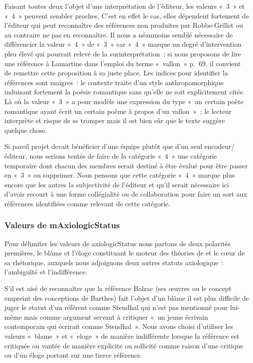 \documentclass[12pt, a4paper]{article}
\begin{document}
Faisant toutes deux l'objet d'une interprétation de l'éditeur, les valeurs «~3~» et «~4~» peuvent sembler proches. C'est en effet le cas, elles dépendent fortement de l'éditeur qui peut reconnaître des références non produites par Robbe-Grillet ou au contraire ne pas en reconnaître. Il nous a néanmoins semblé nécessaire de différencier la valeur «~4~» de «~3~» car «~4~» marque un degré d'intervention plsu élevé qui pourrait relevé de la surinterprétation~: si nous proposons de lire une référence à Lamartine dans l'emploi du terme «~vallon~» p.~69, il convient de remettre cette proposition à sa juste place. Les indices pour identifier la références sont maigres~: le contexte traite d'un style anthropomorphique induisant fortement la poésie romantique sans qu'elle ne soit explicitement citée. Là où la valeur «~3~» a pour modèle une expression du type «~un certain poète romantique ayant écrit un certain poème à propos d'un vallon~»~; le lecteur interprète et risque de se tromper mais il est bien sûr que le texte suggère quelque chose. 

Si pareil projet devait bénéficier d'une équipe plutôt que d'un seul encodeur/éditeur, nous serions tentés de faire de la catégorie «~4~» une catégorie temporaire dont chacun des membres serait destiné à être évalué pour être passer en «~3~» ou supprimer. Nous pensons que cette catégorie «~4~» marque plus encore que les autres la subjectivité de l'éditeur et qu'il serait nécessaire ici d'avoir recourt à une forme collégialité ou de collaboration pour faire un sort aux références identifiées comme relevant de cette catégorie.



\subsubsection{Valeurs de mAxiologicStatus}
Pour délimiter les valeurs de axiologicStatus nous partons de deux polarités premières, le blâme et l'éloge constituant le moteur des théories de \robbe{} et le cœur de sa rhétorique, auxquels nous adjoignons deux autres statuts axiologique~: l'ambiguïté et l'indifférence. 

S'il est aisé de reconnaître que la référence Balzac (ses œuvres ou le concept empreint des conceptions de Barthes) fait l'objet d'un blâme il est plus difficile de juger le statut d'un référent comme Stendhal qui n'est pas mentionné pour lui-même mais comme argument servant à critiquer «~un jeune écrivain contemporain qui écrirait comme Stendhal~». Nous avons choisi d'utiliser les valeurs «~blame~» et «~eloge~» de manière indifférente lorsque la référence est critiquée ou vantée de manière explicite ou sollicité comme raison d'une critique ou d'un éloge portant sur une tierce référence.
\end{document}
